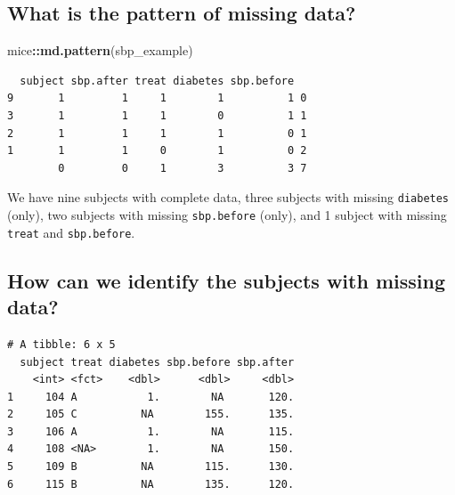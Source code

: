 \documentclass[]{book}
\newenvironment{Shaded}{\begin{snugshade}}{\end{snugshade}}
\newcommand{\KeywordTok}[1]{\textcolor[rgb]{0.13,0.29,0.53}{\textbf{#1}}}
\newcommand{\StringTok}[1]{\textcolor[rgb]{0.31,0.60,0.02}{#1}}
\newcommand{\OperatorTok}[1]{\textcolor[rgb]{0.81,0.36,0.00}{\textbf{#1}}}
\newcommand{\NormalTok}[1]{#1}
\theoremstyle{definition}
\theoremstyle{definition}
\theoremstyle{definition}
\theoremstyle{remark}
\begin{document}
\subsection{What is the pattern of missing
data?}\label{what-is-the-pattern-of-missing-data}

\begin{Shaded}
\begin{Highlighting}[]
\NormalTok{mice}\OperatorTok{::}\KeywordTok{md.pattern}\NormalTok{(sbp_example)}
\end{Highlighting}
\end{Shaded}

\begin{verbatim}
  subject sbp.after treat diabetes sbp.before  
9       1         1     1        1          1 0
3       1         1     1        0          1 1
2       1         1     1        1          0 1
1       1         1     0        1          0 2
        0         0     1        3          3 7
\end{verbatim}

We have nine subjects with complete data, three subjects with missing
\texttt{diabetes} (only), two subjects with missing \texttt{sbp.before}
(only), and 1 subject with missing \texttt{treat} and
\texttt{sbp.before}.

\subsection{How can we identify the subjects with missing
data?}\label{how-can-we-identify-the-subjects-with-missing-data}

\begin{Shaded}
\end{Shaded}

\begin{verbatim}
# A tibble: 6 x 5
  subject treat diabetes sbp.before sbp.after
    <int> <fct>    <dbl>      <dbl>     <dbl>
1     104 A           1.        NA       120.
2     105 C          NA        155.      135.
3     106 A           1.        NA       115.
4     108 <NA>        1.        NA       150.
5     109 B          NA        115.      130.
6     115 B          NA        135.      120.
\end{verbatim}
\end{document}
